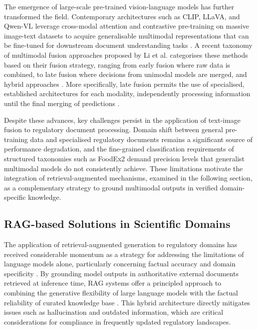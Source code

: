 The emergence of large-scale pre-trained vision-language models has further transformed the field. Contemporary architectures such as CLIP, LLaVA, and Qwen-VL leverage cross-modal attention and contrastive pre-training on massive image-text datasets to acquire generalisable multimodal representations that can be fine-tuned for downstream document understanding tasks \parencite{paul_pu_liang_8415d006}. A recent taxonomy of multimodal fusion approaches proposed by Li et al. categorises these methods based on their fusion strategy, ranging from early fusion where raw data is combined, to late fusion where decisions from unimodal models are merged, and hybrid approaches \parencite{abhinav_ramesh_kashyap_da0a8b8d}. More specifically, late fusion permits the use of specialised, established architectures for each modality, independently processing information until the final merging of predictions \parencite{thibault_douzon_fb62b0d4}.

Despite these advances, key challenges persist in the application of text-image fusion to regulatory document processing. Domain shift between general pre-training data and specialised regulatory documents remains a significant source of performance degradation, and the fine-grained classification requirements of structured taxonomies such as FoodEx2 demand precision levels that generalist multimodal models do not consistently achieve. These limitations motivate the integration of retrieval-augmented mechanisms, examined in the following section, as a complementary strategy to ground multimodal outputs in verified domain-specific knowledge.

\hypertarget{rag-based-solutions-in-scientific-domains}{%
\subsection{RAG-based Solutions in Scientific Domains}\label{rag-based-solutions-in-scientific-domains}}

The application of retrieval-augmented generation to regulatory domains has received considerable momentum as a strategy for addressing the limitations of language models alone, particularly concerning factual accuracy and domain specificity \parencite{monica_riedler_e70c1434}. By grounding model outputs in authoritative external documents retrieved at inference time, RAG systems offer a principled approach to combining the generative flexibility of large language models with the factual reliability of curated knowledge base \parencite{tuba_gokhan_1d9980e9}. This hybrid architecture directly mitigates issues such as hallucination and outdated information, which are critical considerations for compliance in frequently updated regulatory landscapes.

